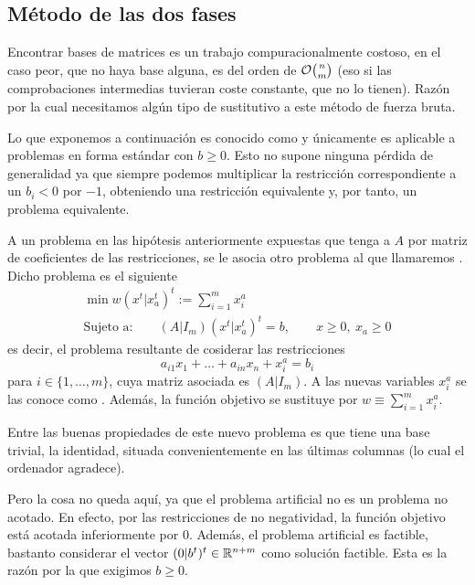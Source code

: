 \subsection{Método de las dos fases}
Encontrar bases de matrices es un trabajo compuracionalmente costoso, en el caso peor, que no haya base alguna, es del orden de $\mathcal{O}\binom{n}{m}$ (eso si las comprobaciones intermedias tuvieran coste constante, que no lo tienen). Razón por la cual necesitamos algún tipo de sustitutivo a este método de fuerza bruta.

Lo que exponemos a continuación es conocido como  y únicamente es aplicable a problemas en forma estándar con $b\geq 0$. Esto no supone ninguna pérdida de generalidad ya que siempre podemos multiplicar la restricción correspondiente a un $b_i<0$ por $-1$, obteniendo una restricción equivalente y, por tanto, un problema equivalente.

A un problema en las hipótesis anteriormente expuestas que tenga a $A$ por matriz de coeficientes de las restricciones, se le asocia otro problema al que llamaremos . Dicho problema es el siguiente
\begin{equation*}
	\begin{array}{c}
		\min w(x^t|x_a^t)^t:=\sum_{i=1}^{m}x_i^a\\
		\text{Sujeto a:}\qquad (A|I_m)(x^t|x_a^t)^t=b,\qquad x\geq 0,\ x_a\geq 0
	\end{array}
\end{equation*}
es decir, el problema resultante de cosiderar las restricciones
\begin{equation*}
	a_{i1}x_1+\dots+a_{in}x_n+x_i^a=b_i
\end{equation*}
para $i\in\{1,\dots,m\}$, cuya matriz asociada es $(A|I_m)$. A las nuevas variables $x_i^a$ se las conoce como . Además, la función objetivo se sustituye por $w\equiv \sum_{i=1}^{m}x_i^a$.

Entre las buenas propiedades de este nuevo problema es que tiene una base trivial, la identidad, situada convenientemente en las últimas columnas (lo cual el ordenador agradece).

Pero la cosa no queda aquí, ya que el problema artificial no es un problema no acotado. En efecto, por las restricciones de no negatividad, la función objetivo está acotada inferiormente por $0$. Además, el problema artificial es factible, bastanto considerar el vector $(0|b^t)^t\in\mathbb{R}^{n+m}$ como solución factible. Esta es la razón por la que exigimos $b\geq 0$.

